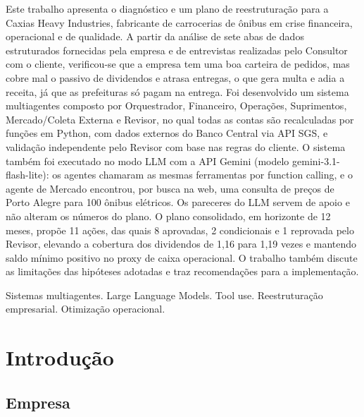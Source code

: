 \documentclass[12pt,a4paper,oneside,brazil]{abntex2}
\newenvironment{palavras-chave}{%
  \par\vspace{0.5em}\noindent\textbf{Palavras-chave:}%
}{\par}
\begin{document}
\imprimircapa
\imprimirfolhaderosto*

\begin{resumo}
Este trabalho apresenta o diagnóstico e um plano de reestruturação para a Caxias Heavy Industries, fabricante de carrocerias de ônibus em crise financeira, operacional e de qualidade. A partir da análise de sete abas de dados estruturados fornecidas pela empresa e de entrevistas realizadas pelo Consultor com o cliente, verificou-se que a empresa tem uma boa carteira de pedidos, mas cobre mal o passivo de dividendos e atrasa entregas, o que gera multa e adia a receita, já que as prefeituras só pagam na entrega. Foi desenvolvido um sistema multiagentes composto por Orquestrador, Financeiro, Operações, Suprimentos, Mercado/Coleta Externa e Revisor, no qual todas as contas são recalculadas por funções em Python, com dados externos do Banco Central via API SGS, e validação independente pelo Revisor com base nas regras do cliente. O sistema também foi executado no modo LLM com a API Gemini (modelo gemini-3.1-flash-lite): os agentes chamaram as mesmas ferramentas por function calling, e o agente de Mercado encontrou, por busca na web, uma consulta de preços de Porto Alegre para 100 ônibus elétricos. Os pareceres do LLM servem de apoio e não alteram os números do plano. O plano consolidado, em horizonte de 12 meses, propõe 11 ações, das quais 8 aprovadas, 2 condicionais e 1 reprovada pelo Revisor, elevando a cobertura dos dividendos de 1,16 para 1,19 vezes e mantendo saldo mínimo positivo no proxy de caixa operacional. O trabalho também discute as limitações das hipóteses adotadas e traz recomendações para a implementação.

\begin{palavras-chave}
Sistemas multiagentes. Large Language Models. Tool use. Reestruturação empresarial. Otimização operacional.
\end{palavras-chave}
\end{resumo}

\listoffigures*\cleardoublepage
{}\listoftables*\cleardoublepage
{}\tableofcontents*\cleardoublepage

\textual

\chapter{Introdução}
\section{Empresa}
\end{document}
